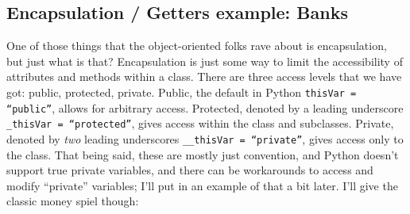 \documentclass[11pt, twoside, reqno]{book}
\begin{document}
\subsection{Encapsulation / Getters example: Banks}

One of those things that the object-oriented folks rave about is encapsulation, but just what is that? Encapsulation is just some way to limit the accessibility of attributes and methods within a class. There are three access levels that we have got: public, protected, private. Public, the default in Python \texttt{thisVar = ``public''}, allows for arbitrary access. Protected, denoted by a leading underscore \texttt{\_thisVar = ``protected''}, gives access within the class and subclasses. Private, denoted by \textit{two} leading underscores \texttt{\_\_thisVar = ``private''}, gives access only to the class. That being said, these are mostly just convention, and Python doesn't support true private variables, and there can be workarounds to access and modify ``private'' variables; I'll put in an example of that a bit later. I'll give the classic money spiel though:
\end{document}
